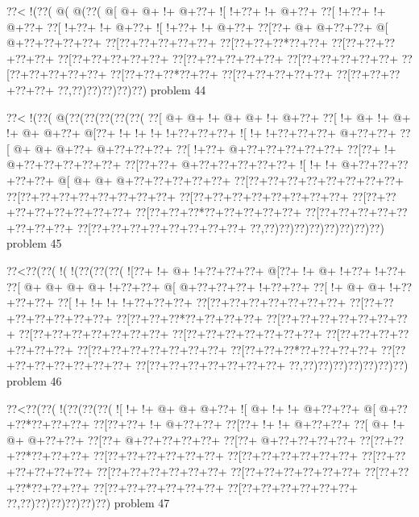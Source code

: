 \vbox{\vbox{\goo
\0??<\- !(\0??(\- @(\- @(\0??(
\- @[\- @+\- @+\- !+\- @+\0??+
\- ![\- !+\0??+\- !+\- @+\0??+
\0??[\- !+\0??+\- !+\- @+\0??+
\0??[\- !+\0??+\- !+\- @+\0??+
\- ![\- !+\0??+\- !+\- @+\0??+
\0??[\0??+\- @+\- @+\0??+\0??+
\- @[\- @+\0??+\0??+\0??+\0??+
\0??[\0??+\0??+\0??+\0??+\0??+
\0??[\0??+\0??+\0??*\0??+\0??+
\0??[\0??+\0??+\0??+\0??+\0??+
\0??[\0??+\0??+\0??+\0??+\0??+
\0??[\0??+\0??+\0??+\0??+\0??+
\0??[\0??+\0??+\0??+\0??+\0??+
\0??[\0??+\0??+\0??+\0??+\0??+
\0??[\0??+\0??+\0??*\0??+\0??+
\0??[\0??+\0??+\0??+\0??+\0??+
\0??[\0??+\0??+\0??+\0??+\0??+
\0??,\0??)\0??)\0??)\0??)\0??)
}
\hfil problem 44\hfil\break
}

\vbox{\vbox{\goo
\0??<\- !(\0??(\- @(\0??(\0??(\0??(\0??(\0??(
\0??[\- @+\- @+\- !+\- @+\- @+\- !+\- @+\0??+
\0??[\- !+\- @+\- !+\- @+\- !+\- @+\- @+\0??+
\- @[\0??+\- !+\- !+\- !+\- !+\0??+\0??+\0??+
\- ![\- !+\- !+\0??+\0??+\0??+\- @+\0??+\0??+
\0??[\- @+\- @+\- @+\0??+\- @+\0??+\0??+\0??+
\0??[\- !+\0??+\- @+\0??+\0??+\0??+\0??+\0??+
\0??[\0??+\- !+\- @+\0??+\0??+\0??+\0??+\0??+
\0??[\0??+\0??+\- @+\0??+\0??+\0??+\0??+\0??+
\- ![\- !+\- !+\- @+\0??+\0??+\0??+\0??+\0??+
\- @[\- @+\- @+\- @+\0??+\0??+\0??+\0??+\0??+
\0??[\0??+\0??+\0??+\0??+\0??+\0??+\0??+\0??+
\0??[\0??+\0??+\0??+\0??+\0??+\0??+\0??+\0??+
\0??[\0??+\0??+\0??+\0??+\0??+\0??+\0??+\0??+
\0??[\0??+\0??+\0??+\0??+\0??+\0??+\0??+\0??+
\0??[\0??+\0??+\0??*\0??+\0??+\0??+\0??+\0??+
\0??[\0??+\0??+\0??+\0??+\0??+\0??+\0??+\0??+
\0??[\0??+\0??+\0??+\0??+\0??+\0??+\0??+\0??+
\0??,\0??)\0??)\0??)\0??)\0??)\0??)\0??)\0??)
}
\hfil problem 45\hfil\break
}

\vbox{\vbox{\goo
\0??<\0??(\0??(\- !(\- !(\0??(\0??(\0??(
\- ![\0??+\- !+\- @+\- !+\0??+\0??+\0??+
\- @[\0??+\- !+\- @+\- !+\0??+\- !+\0??+
\0??[\- @+\- @+\- @+\- @+\- !+\0??+\0??+
\- @[\- @+\0??+\0??+\0??+\- !+\0??+\0??+
\0??[\- !+\- @+\- @+\- !+\0??+\0??+\0??+
\0??[\- !+\- !+\- !+\- !+\0??+\0??+\0??+
\0??[\0??+\0??+\0??+\0??+\0??+\0??+\0??+
\0??[\0??+\0??+\0??+\0??+\0??+\0??+\0??+
\0??[\0??+\0??+\0??*\0??+\0??+\0??+\0??+
\0??[\0??+\0??+\0??+\0??+\0??+\0??+\0??+
\0??[\0??+\0??+\0??+\0??+\0??+\0??+\0??+
\0??[\0??+\0??+\0??+\0??+\0??+\0??+\0??+
\0??[\0??+\0??+\0??+\0??+\0??+\0??+\0??+
\0??[\0??+\0??+\0??+\0??+\0??+\0??+\0??+
\0??[\0??+\0??+\0??*\0??+\0??+\0??+\0??+
\0??[\0??+\0??+\0??+\0??+\0??+\0??+\0??+
\0??[\0??+\0??+\0??+\0??+\0??+\0??+\0??+
\0??,\0??)\0??)\0??)\0??)\0??)\0??)\0??)
}
\hfil problem 46\hfil\break
}

\vbox{\vbox{\goo
\0??<\0??(\0??(\- !(\0??(\0??(\0??(
\- ![\- !+\- !+\- @+\- @+\- @+\0??+
\- ![\- @+\- !+\- !+\- @+\0??+\0??+
\- @[\- @+\0??+\0??*\0??+\0??+\0??+
\0??[\0??+\0??+\- !+\- @+\0??+\0??+
\0??[\0??+\- !+\- !+\- @+\0??+\0??+
\0??[\- @+\- !+\- @+\- @+\0??+\0??+
\0??[\0??+\- @+\0??+\0??+\0??+\0??+
\0??[\0??+\- @+\0??+\0??+\0??+\0??+
\0??[\0??+\0??+\0??*\0??+\0??+\0??+
\0??[\0??+\0??+\0??+\0??+\0??+\0??+
\0??[\0??+\0??+\0??+\0??+\0??+\0??+
\0??[\0??+\0??+\0??+\0??+\0??+\0??+
\0??[\0??+\0??+\0??+\0??+\0??+\0??+
\0??[\0??+\0??+\0??+\0??+\0??+\0??+
\0??[\0??+\0??+\0??*\0??+\0??+\0??+
\0??[\0??+\0??+\0??+\0??+\0??+\0??+
\0??[\0??+\0??+\0??+\0??+\0??+\0??+
\0??,\0??)\0??)\0??)\0??)\0??)\0??)
}
\hfil problem 47\hfil\break
}

